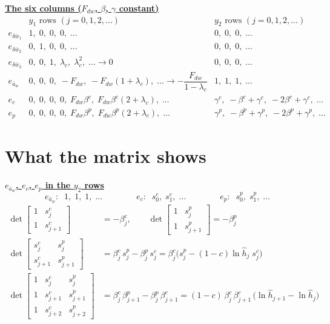 \documentclass[11pt,a4paper]{ctexart}
\newcommand{\lc}{\lambda_c}
\newcommand{\ba}{\bar{a}}
\newcommand{\bw}{\bar{w}}
\newcommand{\hh}{\hat{h}}
\newcommand{\hd}[1]{\par\bigskip\noindent\underline{\textbf{#1}}}
\begin{document}
\hd{The six columns ($F_{dw}$, $\beta$, $\gamma$ constant)}
{\small
\[
\begin{array}{c|l|l}
 & y_1 \text{ rows } (j = 0, 1, 2, \dots) & y_2 \text{ rows } (j = 0, 1, 2, \dots) \\ \hline
e_{\delta\bw_1} & 1,\; 0,\; 0,\; 0,\; \dots & 0,\; 0,\; 0,\; \dots \\
e_{\delta\bw_2} & 0,\; 1,\; 0,\; 0,\; \dots & 0,\; 0,\; 0,\; \dots \\
e_{\delta\bw_3} & 0,\; 0,\; 1,\; \lc,\; \lc^2,\; \dots \to 0 & 0,\; 0,\; 0,\; \dots \\
e_{\ba_w} & 0,\; 0,\; 0,\; -F_{dw},\; -F_{dw}(1+\lc),\; \dots \to -\dfrac{F_{dw}}{1-\lc} & 1,\; 1,\; 1,\; \dots \\[1.2ex]
e_c & 0,\; 0,\; 0,\; 0,\; F_{dw}\beta^{c},\; F_{dw}\beta^{c}(2+\lc),\; \dots & \gamma^{c},\; -\beta^{c}+\gamma^{c},\; -2\beta^{c}+\gamma^{c},\; \dots \\[0.6ex]
e_p & 0,\; 0,\; 0,\; 0,\; F_{dw}\beta^{p},\; F_{dw}\beta^{p}(2+\lc),\; \dots & \gamma^{p},\; -\beta^{p}+\gamma^{p},\; -2\beta^{p}+\gamma^{p},\; \dots
\end{array}
\]
}

\clearpage
\section{What the matrix shows}

\hd{$e_{\ba_w}$, $e_c$, $e_p$ in the $y_2$ rows}
\[
e_{\ba_w}:\;\; 1,\; 1,\; 1,\; \dots \qquad\qquad
e_c:\;\; s^{c}_0,\; s^{c}_1,\; \dots \qquad\qquad
e_p:\;\; s^{p}_0,\; s^{p}_1,\; \dots
\]
\[
\begin{aligned}
\det\begin{bmatrix} 1 & s^{c}_j \\ 1 & s^{c}_{j+1} \end{bmatrix} &= -\beta^{c}_j, \qquad
\det\begin{bmatrix} 1 & s^{p}_j \\ 1 & s^{p}_{j+1} \end{bmatrix} = -\beta^{p}_j \\
\det\begin{bmatrix} s^{c}_j & s^{p}_j \\ s^{c}_{j+1} & s^{p}_{j+1} \end{bmatrix} &= \beta^{c}_j\,s^{p}_j - \beta^{p}_j\,s^{c}_j
= \beta^{c}_j\Big(s^{p}_j - (1-c)\ln\hh_j\; s^{c}_j\Big) \\
\det\begin{bmatrix} 1 & s^{c}_j & s^{p}_j \\ 1 & s^{c}_{j+1} & s^{p}_{j+1} \\ 1 & s^{c}_{j+2} & s^{p}_{j+2} \end{bmatrix}
&= \beta^{c}_j\,\beta^{p}_{j+1} - \beta^{p}_j\,\beta^{c}_{j+1}
= (1-c)\,\beta^{c}_j\,\beta^{c}_{j+1}\,\big(\ln\hh_{j+1} - \ln\hh_j\big)
\end{aligned}
\]
\end{document}
